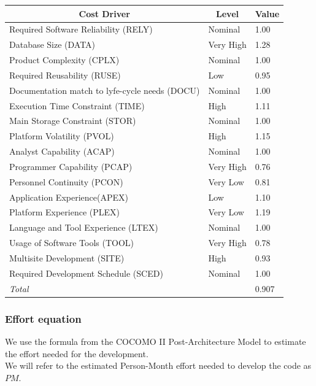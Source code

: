 \documentclass[english]{article}
\begin{document}
\begin{center}
	\begin{tabular}{|p{8cm}|p{2cm}|p{1cm}|}
		\hline
		\multicolumn{1}{|c|}{\textbf{Cost Driver}} & \multicolumn{1}{c|}{\textbf{Level}} & \multicolumn{1}{c|}{\textbf{Value}} \\
		\hline
		Required Software Reliability (RELY) & Nominal & 1.00 \\
		Database Size (DATA) & Very High & 1.28 \\
		Product Complexity (CPLX) & Nominal & 1.00 \\
		Required Reusability (RUSE) & Low & 0.95 \\
		Documentation match to lyfe-cycle needs (DOCU) & Nominal & 1.00 \\
		Execution Time Constraint (TIME) & High & 1.11 \\
		Main Storage Constraint (STOR) & Nominal & 1.00 \\
		Platform Volatility (PVOL) & High & 1.15 \\
		Analyst Capability (ACAP) & Nominal & 1.00 \\
		Programmer Capability (PCAP) & Very High & 0.76 \\
		Personnel Continuity (PCON) & Very Low & 0.81 \\
		Application Experience(APEX) & Low & 1.10 \\
		Platform Experience (PLEX) & Very Low & 1.19 \\
		Language and Tool Experience (LTEX) & Nominal & 1.00 \\
		Usage of Software Tools (TOOL) & Very High & 0.78 \\
		Multisite Development (SITE) & High & 0.93 \\
		Required Development Schedule (SCED) & Nominal & 1.00 \\
		\hline
		\multicolumn{2}{|l|}{\textit{Total}} & 0.907 \\
		\hline
	\end{tabular}
\end{center}


\subsubsection{Effort equation}

We use the formula from the COCOMO II Post-Architecture Model to estimate the effort needed for the development.
\\We will refer to the estimated Person-Month effort needed to develop the code as $PM$.
\end{document}
